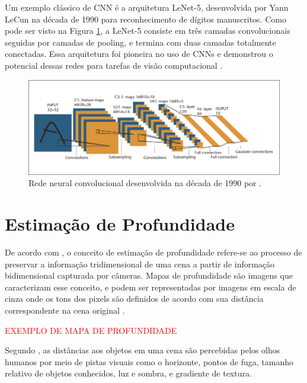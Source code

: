 Um exemplo clássico de CNN é a arquitetura LeNet-5, desenvolvida por Yann LeCun na década de 1990 para reconhecimento de dígitos manuscritos. Como pode ser visto na Figura \ref{fig:lenet5}, a LeNet-5 consiste em três camadas convolucionais seguidas por camadas de pooling, e termina com duas camadas totalmente conectadas. Essa arquitetura foi pioneira no uso de CNNs e demonstrou o potencial dessas redes para tarefas de visão computacional \cite{lecun1998gradient}.

\begin{figure}
    \centering   
    \includegraphics[width=\textwidth]{fig/A-Convolutional-Neural-Net-LeNet-5-From-Lecun-et-al-1998-C1998-IEEE-reprinted.png}
    \caption{Rede neural convolucional desenvolvida na década de 1990 por .}
    \label{fig:lenet5}
\end{figure}


\section{Estimação de Profundidade}


De acordo com , o conceito de estimação de profundidade refere-se ao processo de preservar a informação tridimensional de uma cena a partir de informação bidimensional capturada por câmeras. Mapas de profundidade são imagens que caracterizam esse conceito, e podem ser representadas por imagens em escala de cinza onde os tons dos pixels são definidos de acordo com sua distância correspondente na cena original \cite{dourado2020multi}. 

\textcolor{red}{EXEMPLO DE MAPA DE PROFUNDIDADE}



Segundo , as distâncias aos objetos em uma cena são percebidas pelos olhos humanos por meio de pistas visuais como o horizonte, pontos de fuga, tamanho relativo de objetos conhecidos, luz e sombra, e gradiente de textura.  



